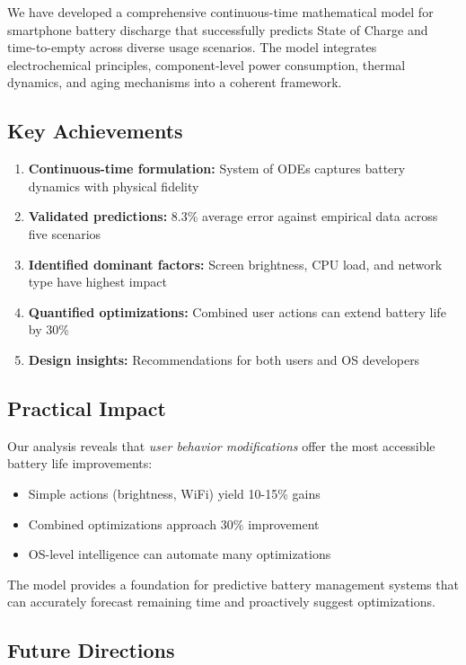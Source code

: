 \documentclass[12pt]{article}
\begin{document}
We have developed a comprehensive continuous-time mathematical model for smartphone battery discharge that successfully predicts State of Charge and time-to-empty across diverse usage scenarios. The model integrates electrochemical principles, component-level power consumption, thermal dynamics, and aging mechanisms into a coherent framework.

\subsection{Key Achievements}

\begin{enumerate}
\item \textbf{Continuous-time formulation:} System of ODEs captures battery dynamics with physical fidelity
\item \textbf{Validated predictions:} 8.3\% average error against empirical data across five scenarios
\item \textbf{Identified dominant factors:} Screen brightness, CPU load, and network type have highest impact
\item \textbf{Quantified optimizations:} Combined user actions can extend battery life by 30\%
\item \textbf{Design insights:} Recommendations for both users and OS developers
\end{enumerate}

\subsection{Practical Impact}

Our analysis reveals that \textit{user behavior modifications} offer the most accessible battery life improvements:
\begin{itemize}
\item Simple actions (brightness, WiFi) yield 10-15\% gains
\item Combined optimizations approach 30\% improvement
\item OS-level intelligence can automate many optimizations
\end{itemize}

The model provides a foundation for predictive battery management systems that can accurately forecast remaining time and proactively suggest optimizations.

\subsection{Future Directions}
\end{document}
